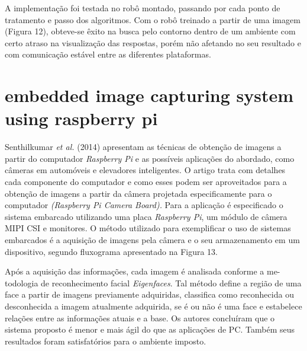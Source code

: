 \documentclass[12pt,oneside,a4paper,chapter=TITLE,section=TITLE,sumario=tradicional]{abntex2}
\begin{document}
\begin{figure}[htb]
\end{figure}

A implementação foi testada no robô montado, passando por cada ponto de tratamento e passo dos algoritmos. Com o robô treinado a partir de uma imagem (Figura 12), obteve-se êxito na busca pelo contorno dentro de um ambiente com certo atraso na visualização das respostas, porém não afetando no seu resultado e com comunicação estável entre as diferentes plataformas.

\begin{figure}[htb]
\end{figure}


\section{embedded image capturing system using raspberry pi}
Senthilkumar \textit{et al.} (2014) apresentam as técnicas de obtenção de imagens a partir do computador \textit{Raspberry Pi} e as possíveis aplicações do abordado, como câmeras em automóveis e elevadores inteligentes. O artigo trata com detalhes cada componente do computador e como esses podem ser aproveitados para a obtenção de imagens a partir da câmera projetada especificamente para o computador \textit{(Raspberry Pi Camera Board).}
Para a aplicação é especificado o sistema embarcado utilizando uma placa \textit{Raspberry Pi}, um módulo de câmera MIPI CSI e monitores. O método utilizado para exemplificar o uso de sistemas embarcados é a aquisição de imagens pela câmera e o seu armazenamento em um dispositivo, segundo fluxograma apresentado na Figura 13.

\begin{figure}[htb]
\end{figure}

Após a aquisição das informações, cada imagem é analisada conforme a me-todologia de reconhecimento facial \textit{Eigenfaces}. Tal método define a região de uma face a partir de imagens previamente adquiridas, classifica como reconhecida ou desconhecida a imagem atualmente adquirida, se é ou não é uma face e estabelece relações entre as informações atuais e a base.
Os autores concluíram que o sistema proposto é menor e mais ágil do que as aplicações de PC. Também seus resultados foram satisfatórios para o ambiente imposto.
\end{document}
